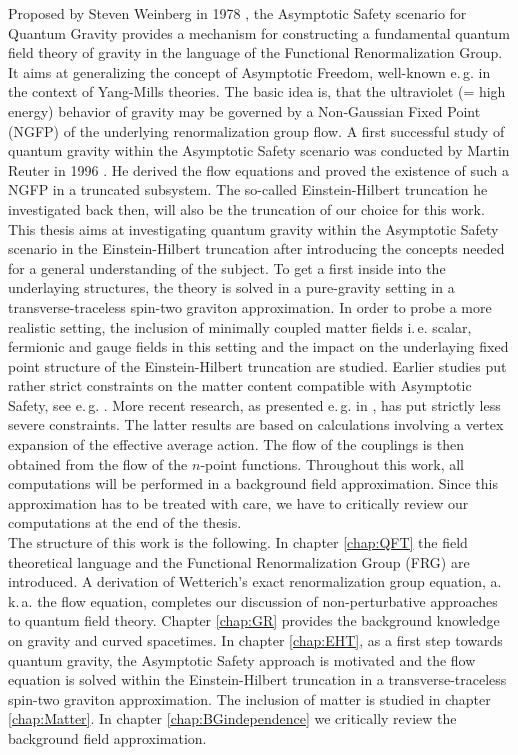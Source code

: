 Proposed by Steven Weinberg in 1978 \cite{Weinberg1980}, the Asymptotic Safety scenario for Quantum Gravity provides a mechanism for constructing a fundamental quantum field theory of gravity in the language of the Functional Renormalization Group. It aims at generalizing the concept of Asymptotic Freedom, well-known e.\,g. in the context of Yang-Mills theories. The basic idea is, that the ultraviolet (= high energy) behavior of gravity may be governed by a Non-Gaussian Fixed Point (NGFP) of the underlying renormalization group flow. A first successful study of quantum gravity within the Asymptotic Safety scenario was conducted by Martin Reuter in 1996 \cite{Reuter1996}. He derived the flow equations and proved the existence of such a NGFP in a truncated subsystem. The so-called Einstein-Hilbert truncation he investigated back then, will also be the truncation of our choice for this work. \\
This thesis aims at investigating quantum gravity within the Asymptotic Safety scenario in the Einstein-Hilbert truncation after introducing the concepts needed for a general understanding of the subject. To get a first inside into the underlaying structures, the theory is solved in a pure-gravity setting in a transverse-traceless spin-two graviton approximation. In order to probe a more realistic setting, the inclusion of  minimally coupled matter fields i.\,e. scalar, fermionic and gauge fields in this setting and the impact on the underlaying fixed point structure of the Einstein-Hilbert truncation are studied. Earlier studies put rather strict constraints on the matter content compatible with Asymptotic Safety, see e.\,g. \cite{DonaEichhornPercacci2013}. More recent research, as presented  e.\,g. in \cite{MeibohmPawlowskiReichert2015, ChristiansenLitimPawlowskiReichert2018}, has put strictly less severe constraints. The latter results are based on calculations involving a vertex expansion of the effective average action. The flow of the couplings is then obtained from the flow of the $n$-point functions.
 Throughout this work, all computations will be performed in a background field approximation. Since this approximation has to be treated with care, we have to critically review our computations at the end of the thesis. \\
The structure of this work is the following. In chapter \ref{chap:QFT} the field theoretical language and the Functional Renormalization Group (FRG) are introduced. A derivation of Wetterich's exact renormalization group equation, a.\,k.\,a. the flow equation,  completes our discussion of non-perturbative approaches to quantum field theory. Chapter \ref{chap:GR} provides the background knowledge on gravity and curved spacetimes. In chapter \ref{chap:EHT}, as a first step towards quantum gravity, the Asymptotic Safety approach is motivated and the flow equation is solved within the Einstein-Hilbert truncation in a transverse-traceless spin-two graviton approximation. The inclusion of matter is studied in chapter \ref{chap:Matter}. In chapter \ref{chap:BGindependence} we critically review the background field approximation.

